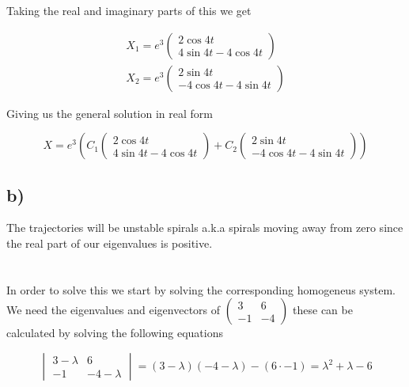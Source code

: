 \documentclass[a4paper]{article}
\begin{document}
Taking the real and imaginary parts of this we get

\begin{align}
    X_1 = e^3
    \begin{pmatrix}
        2\cos4t \\
        4\sin4t - 4\cos4t
    \end{pmatrix} \\
    X_2 = e^3
    \begin{pmatrix}
        2\sin4t \\
        -4\cos4t - 4\sin4t
    \end{pmatrix}
\end{align}

Giving us the general solution in real form

\begin{equation}
    X = e^3 \left (
    C_1\begin{pmatrix}
        2\cos4t \\
        4\sin4t - 4\cos4t
    \end{pmatrix} +
    C_2 \begin{pmatrix}
        2\sin4t \\
        -4\cos4t - 4\sin4t
    \end{pmatrix} \right )
\end{equation}

\subsection*{b)}

The trajectories will be unstable spirals a.k.a spirals moving away from zero since the real part of our eigenvalues is positive. 


\section{}

In order to solve this we start by solving the corresponding homogeneus system. We need the eigenvalues and eigenvectors of $\begin{pmatrix}
    3 & 6 \\
    -1 & -4
\end{pmatrix}$ these can be calculated by solving the following equations

\begin{equation}
    \begin{vmatrix}
        3-\lambda & 6 \\
        -1 & -4 - \lambda
    \end{vmatrix} = (3-\lambda)(-4-\lambda) - (6\cdot -1) = \lambda^2 + \lambda  -6 
\end{equation}
\end{document}
